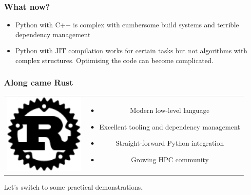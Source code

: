 \documentclass[dvipsnames,10pt]{beamer}
\begin{document}
\begin{frame}

	\frametitle{What now?}
	
	\begin{itemize}
	\item Python with C++ is complex with cumbersome build systems and terrible dependency management
	\item Python with JIT compilation works for certain tasks but not algorithms with complex structures. Optimising
		the code can become complicated.
	\end{itemize}
	
\end{frame}

\begin{frame}
	\frametitle{Along came Rust}
	
	\begin{center}
	\begin{tabular}{cc}
		\begin{minipage}{5cm}
		\includegraphics[width=4cm]{../figs/rust_logo.png}
		\end{minipage} &
		\begin{minipage}{6cm}
			\begin{itemize}
				\item Modern low-level language
				\item Excellent tooling and dependency management
				\item Straight-forward Python integration
				\item Growing HPC community
			\end{itemize}
		\end{minipage}
	\end{tabular}
	\end{center}
	
\begin{tcolorbox}Let's switch to some practical demonstrations.
\end{tcolorbox}
	
\end{frame}
\end{document}
